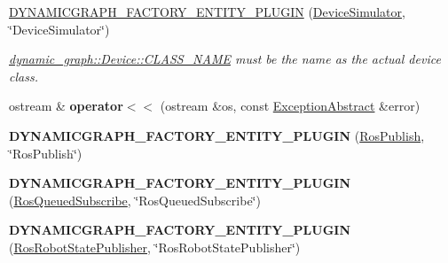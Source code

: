 \begin{DoxyCompactItemize}
\item 
\mbox{\label{namespacedynamic__graph_ac2b17f51aa9541c0b023291d4090be56}} 
\hyperlink{namespacedynamic__graph_ac2b17f51aa9541c0b023291d4090be56}{D\+Y\+N\+A\+M\+I\+C\+G\+R\+A\+P\+H\+\_\+\+F\+A\+C\+T\+O\+R\+Y\+\_\+\+E\+N\+T\+I\+T\+Y\+\_\+\+P\+L\+U\+G\+IN} (\hyperlink{classdynamic__graph_1_1DeviceSimulator}{Device\+Simulator}, \char`\"{}Device\+Simulator\char`\"{})
\begin{DoxyCompactList}\small\item\em \hyperlink{classdynamic__graph_1_1Device_ab1612928a8cf1a9133fb2571f99095b1}{dynamic\+\_\+graph\+::\+Device\+::\+C\+L\+A\+S\+S\+\_\+\+N\+A\+ME} must be the name as the actual device class. \end{DoxyCompactList}\item 
\mbox{\label{namespacedynamic__graph_a44046716acbcd14008a1672f9bb71594}} 
ostream \& {\bfseries operator$<$$<$} (ostream \&os, const \hyperlink{classdynamic__graph_1_1ExceptionAbstract}{Exception\+Abstract} \&error)
\item 
\mbox{\label{namespacedynamic__graph_aaf61d1f7c7646131f1c84b121a76389b}} 
{\bfseries D\+Y\+N\+A\+M\+I\+C\+G\+R\+A\+P\+H\+\_\+\+F\+A\+C\+T\+O\+R\+Y\+\_\+\+E\+N\+T\+I\+T\+Y\+\_\+\+P\+L\+U\+G\+IN} (\hyperlink{classdynamic__graph_1_1RosPublish}{Ros\+Publish}, \char`\"{}Ros\+Publish\char`\"{})
\item 
\mbox{\label{namespacedynamic__graph_a6950a8bb3e1f1984e0193c3b01dc8b37}} 
{\bfseries D\+Y\+N\+A\+M\+I\+C\+G\+R\+A\+P\+H\+\_\+\+F\+A\+C\+T\+O\+R\+Y\+\_\+\+E\+N\+T\+I\+T\+Y\+\_\+\+P\+L\+U\+G\+IN} (\hyperlink{classdynamic__graph_1_1RosQueuedSubscribe}{Ros\+Queued\+Subscribe}, \char`\"{}Ros\+Queued\+Subscribe\char`\"{})
\item 
\mbox{\label{namespacedynamic__graph_a2cb1eace1da90f948ff259a74b38b5be}} 
{\bfseries D\+Y\+N\+A\+M\+I\+C\+G\+R\+A\+P\+H\+\_\+\+F\+A\+C\+T\+O\+R\+Y\+\_\+\+E\+N\+T\+I\+T\+Y\+\_\+\+P\+L\+U\+G\+IN} (\hyperlink{classdynamic__graph_1_1RosRobotStatePublisher}{Ros\+Robot\+State\+Publisher}, \char`\"{}Ros\+Robot\+State\+Publisher\char`\"{})
\item 
\mbox{\label{namespacedynamic__graph_a8be8c7e1f665ecb0207bb48c0ddde58e}} 

\end{DoxyCompactItemize}
